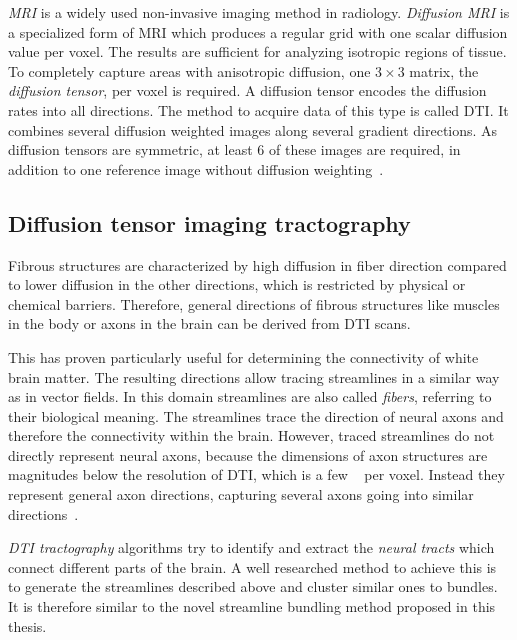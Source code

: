 \emph{\ac{MRI}} is a widely used non-invasive \threed imaging method in radiology. \emph{Diffusion \ac{MRI}} is a specialized form of \ac{MRI} which produces a regular \threed grid with one scalar diffusion value per voxel. 
The results are sufficient for analyzing isotropic regions of tissue. To completely capture areas with anisotropic diffusion, one $3\times3$ matrix, the \emph{diffusion tensor}, per voxel is required. A diffusion tensor encodes the diffusion rates into all directions. The method to acquire data of this type is called \ac{DTI}. It combines several diffusion weighted images along several gradient directions. As diffusion tensors are symmetric, at least \num{6} of these images are required, in addition to one reference image without diffusion weighting~\cite{DTI}.


\subsection{Diffusion tensor imaging tractography}

Fibrous structures are characterized by high diffusion in fiber direction compared to lower diffusion in the other directions, which is restricted by physical or chemical barriers. Therefore, general directions of fibrous structures like muscles in the body or axons in the brain can be derived from \ac{DTI} scans.

This has proven particularly useful for determining the connectivity of white brain matter. The resulting directions allow tracing streamlines in a similar way as in vector fields. In this domain streamlines are also called \emph{fibers}, referring to their biological meaning. The streamlines trace the direction of neural axons and therefore the connectivity within the brain. However, traced streamlines do not directly represent neural axons, because the dimensions of axon structures %
are magnitudes below the resolution of \ac{DTI}, which is a few \si{{\cubic{\milli\meter}}}~\cite{DTI} per voxel. 
Instead they represent general axon directions, capturing several axons going into similar directions~\cite{Schultz}.

\emph{\ac{DTI} tractography} algorithms try to identify and extract the \emph{neural tracts} which connect different parts of the brain. A well researched method to achieve this is to generate the streamlines described above and cluster similar ones to bundles. It is therefore similar to the novel streamline bundling method proposed in this thesis.

